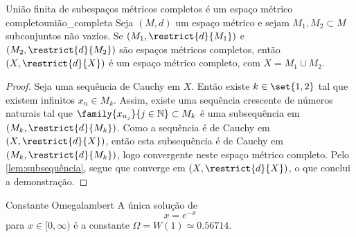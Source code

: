 \begin{lemma}{União finita de subespaços métricos completos é um espaço métrico completo}{união_completa}
    Seja \((M,d)\) um espaço métrico e sejam \(M_1, M_2 \subset M\) subconjuntos não vazios. Se \((M_1, \restrict{d}{M_1})\) e \((M_2, \restrict{d}{M_2})\) são espaços métricos completos, então \((X, \restrict{d}{X})\) é um espaço métrico completo, com \(X = M_1 \cup M_2\).
\end{lemma}
\begin{proof}
    Seja  uma sequência de Cauchy em \(X\). Então existe \(k \in \set{1,2}\) tal que existem infinitos \(x_n \in M_k\). Assim, existe uma sequência crescente  de números naturais tal que \(\family{x_{n_j}}{j\in \mathbb{N}} \subset M_k\) é uma subsequência em \((M_k,\restrict{d}{M_k})\). Como a sequência é de Cauchy em \((X, \restrict{d}{X})\), então esta subsequência é de Cauchy em \((M_k, \restrict{d}{M_k})\), logo convergente neste espaço métrico completo. Pelo \cref{lem:subsequência}, segue que  converge em \((X, \restrict{d}{X})\), o que conclui a demonstração.
\end{proof}
\begin{proposition}{Constante Omega}{lambert}
    A única solução de
    \begin{equation*}
        x = e^{-x}
    \end{equation*}
    para \(x \in [0,\infty)\) é a constante \(\Omega = W(1) \simeq 0.56714.\)
\end{proposition}
